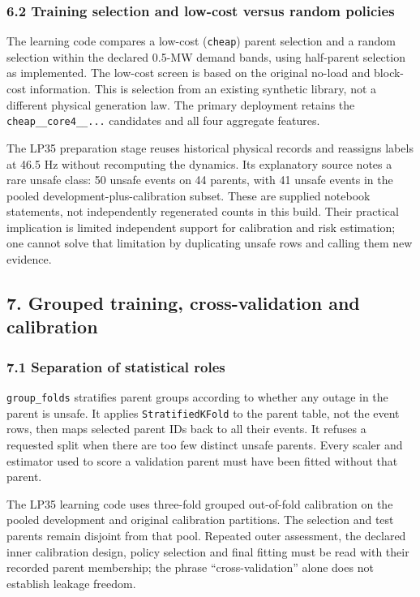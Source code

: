 \documentclass[
  11pt,
  a4paper,
]{article}
\begin{document}
\subsubsection{6.2 Training selection and low-cost versus random
policies}\label{training-selection-and-low-cost-versus-random-policies}

The learning code compares a low-cost (\texttt{cheap}) parent selection
and a random selection within the declared 0.5-MW demand bands, using
half-parent selection as implemented. The low-cost screen is based on
the original no-load and block-cost information. This is selection from
an existing synthetic library, not a different physical generation law.
The primary deployment retains the \texttt{cheap\_\_core4\_\_...}
candidates and all four aggregate features.

The LP35 preparation stage reuses historical physical records and
reassigns labels at 46.5 Hz without recomputing the dynamics. Its
explanatory source notes a rare unsafe class: 50 unsafe events on 44
parents, with 41 unsafe events in the pooled
development-plus-calibration subset. These are supplied notebook
statements, not independently regenerated counts in this build. Their
practical implication is limited independent support for calibration and
risk estimation; one cannot solve that limitation by duplicating unsafe
rows and calling them new evidence.

\subsection{7. Grouped training, cross-validation and
calibration}\label{grouped-training-cross-validation-and-calibration}

\subsubsection{7.1 Separation of statistical
roles}\label{separation-of-statistical-roles}

\texttt{group\_folds} stratifies parent groups according to whether any
outage in the parent is unsafe. It applies \texttt{StratifiedKFold} to
the parent table, not the event rows, then maps selected parent IDs back
to all their events. It refuses a requested split when there are too few
distinct unsafe parents. Every scaler and estimator used to score a
validation parent must have been fitted without that parent.

The LP35 learning code uses three-fold grouped out-of-fold calibration
on the pooled development and original calibration partitions. The
selection and test parents remain disjoint from that pool. Repeated
outer assessment, the declared inner calibration design, policy
selection and final fitting must be read with their recorded parent
membership; the phrase ``cross-validation'' alone does not establish
leakage freedom.
\end{document}
